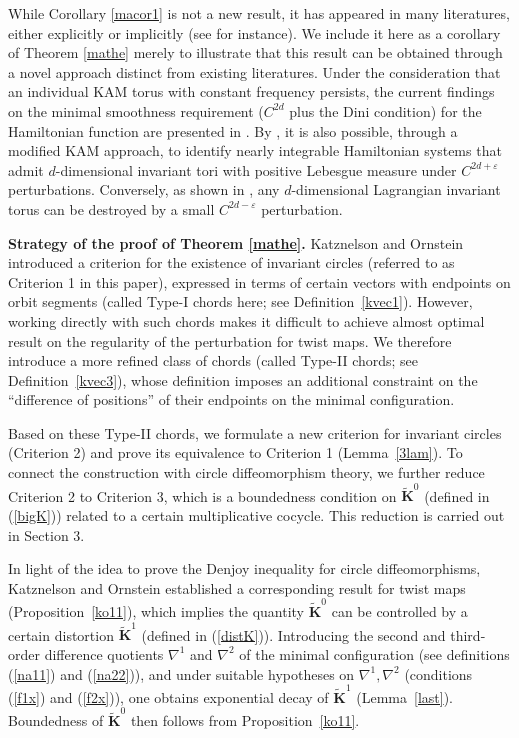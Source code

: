 \documentclass{amsart}
\theoremstyle{definition}
\begin{document}
While Corollary \ref{macor1} is not a new result,  it has appeared in many literatures, either explicitly or implicitly (see \cite{A,Sa,TL} for instance). We include it here as a corollary of Theorem \ref{mathe} merely to illustrate that this result can be obtained through a novel approach distinct from existing literatures. Under the consideration that an individual KAM torus with constant frequency persists, the current findings on the minimal smoothness requirement ($C^{2d}$ plus the Dini condition) for the Hamiltonian function are presented in \cite{A,TL}.  By \cite{Bou, Kou}, it is also possible, through a modified KAM approach, to identify nearly integrable Hamiltonian systems that admit \( d \)-dimensional invariant tori with positive Lebesgue measure under \( C^{2d+\varepsilon} \) perturbations. Conversely, as shown in \cite{CW,W2}, any \( d \)-dimensional Lagrangian invariant torus can be destroyed by a small \( C^{2d-\varepsilon} \) perturbation.


\vspace{1em}

\noindent\textbf{Strategy of the proof of Theorem \ref{mathe}.} Katznelson and Ornstein \cite{KO1} introduced a criterion for the existence of invariant circles (referred to as Criterion 1 in this paper), expressed in terms of certain vectors with endpoints on orbit segments (called Type-I chords here; see Definition~\ref{kvec1}). However, working directly with such chords makes it difficult to achieve almost optimal result on the regularity of the perturbation for twist maps. We therefore introduce a more refined class of chords (called Type-II chords; see Definition~\ref{kvec3}), whose definition imposes an additional constraint on the ``difference of positions'' of their endpoints on the minimal configuration.

Based on these Type-II chords, we formulate a new criterion for invariant circles (Criterion 2) and prove its equivalence to Criterion 1 (Lemma~\ref{3lam}). To connect the construction with circle diffeomorphism theory, we further reduce Criterion 2 to Criterion 3, which is a boundedness condition on \(\widetilde{\mathbf{K}}^0\) (defined  in (\ref{bigK})) related to a certain multiplicative cocycle. This reduction is carried out in Section 3.

In light of the idea to prove the Denjoy inequality for circle diffeomorphisms, Katznelson and Ornstein \cite{KO1} established a corresponding result for twist maps  (Proposition~\ref{ko11}), which implies the quantity \(\widetilde{\mathbf{K}}^0\) can be controlled by a certain distortion \(\widetilde{\mathbf{K}}^1\) (defined in (\ref{distK})). Introducing the second and third-order difference quotients \(\nabla^1\) and \(\nabla^2\) of the minimal configuration (see definitions (\ref{na11}) and (\ref{na22})), and under suitable hypotheses on \(\nabla^1,\nabla^2\) (conditions (\ref{f1x}) and (\ref{f2x})), one obtains exponential decay of \(\widetilde{\mathbf{K}}^1\) (Lemma~\ref{last}).  Boundedness of \(\widetilde{\mathbf{K}}^0\) then follows from Proposition~\ref{ko11}.
\end{document}
